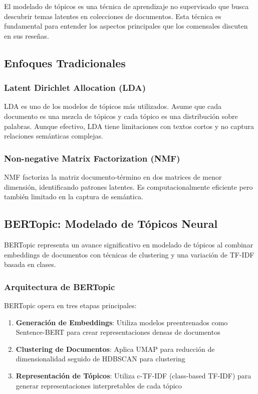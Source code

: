 \documentclass[12pt,a4paper,twoside,openany]{book}
\begin{document}
El modelado de tópicos es una técnica de aprendizaje no supervisado que busca descubrir temas latentes en colecciones de documentos. Esta técnica es fundamental para entender los aspectos principales que los comensales discuten en sus reseñas.

\subsection{Enfoques Tradicionales}

\subsubsection{Latent Dirichlet Allocation (LDA)}

LDA es uno de los modelos de tópicos más utilizados. Asume que cada documento es una mezcla de tópicos y cada tópico es una distribución sobre palabras. Aunque efectivo, LDA tiene limitaciones con textos cortos y no captura relaciones semánticas complejas.

\subsubsection{Non-negative Matrix Factorization (NMF)}

NMF factoriza la matriz documento-término en dos matrices de menor dimensión, identificando patrones latentes. Es computacionalmente eficiente pero también limitado en la captura de semántica.

\subsection{BERTopic: Modelado de Tópicos Neural}

BERTopic representa un avance significativo en modelado de tópicos al combinar embeddings de documentos con técnicas de clustering y una variación de TF-IDF basada en clases.

\subsubsection{Arquitectura de BERTopic}

BERTopic opera en tres etapas principales:

\begin{enumerate}
    \item \textbf{Generación de Embeddings}: Utiliza modelos preentrenados como Sentence-BERT para crear representaciones densas de documentos
    \item \textbf{Clustering de Documentos}: Aplica UMAP para reducción de dimensionalidad seguido de HDBSCAN para clustering
    \item \textbf{Representación de Tópicos}: Utiliza c-TF-IDF (class-based TF-IDF) para generar representaciones interpretables de cada tópico
\end{enumerate}
\end{document}
